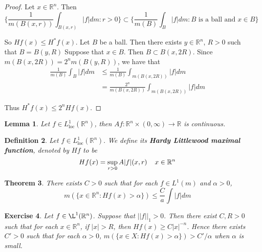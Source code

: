 \documentclass[12pt]{amsart}
\newtheorem{thm}{Theorem}[subsection]
\newtheorem{lem}[thm]{Lemma}
\newtheorem{defn}[thm]{Definition}
\newtheorem{ex}[thm]{Exercise}
\newcommand{\al}{\alpha}
\newcommand{\R}{\mathbb{R}}
\newcommand{\Ll}{L^1_{\text{loc}}(\R^n)}
\begin{document}
	\begin{proof}
		Let $x \in \R^n$. Then $$\bigg \{ \frac{1}{m(B(x,r))}\int_{B(x,r)}|f|dm: r >0\bigg \} \subset \bigg\{ \frac{1}{m(B)}\int_{B}|f|dm: B \text{ is a ball and } x \in B \bigg\} $$
		
		So $Hf(x) \leq H^*f(x)$. Let $B$ be a ball. Then there exists $y \in \R^n$, $R>0$ such that $B = B(y,R)$ Suppose that $x \in B$. Then $B \subset B(x,2R)$. Since $m(B(x,2R)) = 2^n m(B(y,R))$, we have that 
		\begin{align*}
			\frac{1}{m(B)}\int_{B}|f|dm
			& \leq \frac{1}{m(B)} \int_{m(B(x,2R))}|f|dm\\
			&= \frac{2^n}{m(B(x,2R))} \int_{m(B(x,2R))}|f|dm
		\end{align*}
		
		Thus $H^*f(x) \leq 2^n Hf(x)$.
	\end{proof}
	
	\begin{lem}
		Let $f \in \Ll$, then $Af:\R^n \times (0, \infty)\rightarrow \R$ is continuous.
	\end{lem}
	
	\begin{defn}
		Let $f \in \Ll$. We define its \textbf{Hardy Littlewood maximal function}, denoted by $Hf$ to be $$Hf(x) = \sup_{r>0} A|f|(x,r) \hspace{4mm} x \in \R^n$$
	\end{defn}
	
	\begin{thm}
		There exists $C >0$ such that for each $f \in L^1(m)$ and $\al > 0$, $$m(\{x \in \R^n: Hf(x) > \al\}) \leq \frac{C}{a} \int |f|dm$$
	\end{thm}
	
	\begin{ex}
		Let $f \in \L^1(\R^n)$. Suppose that $||f||_1>0$. Then there exist $C,R>0$ such that for each $x \in \R^n$, if $|x| > R$, then $Hf(x) \geq C|x|^{-n}$. Hence there exists $C' > 0$ such that for each $\al >0$, $m(\{x \in X: Hf(x)>\alpha\}) > C'/\al$ when $\al$ is small. 
	\end{ex}
	
\end{document}
